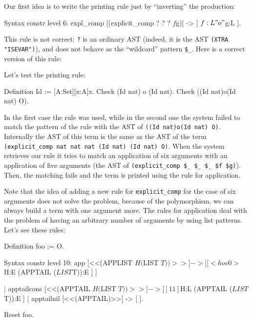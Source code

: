 {Our first idea is to write the printing rule just by ``inverting'' the
production:

\begin{coq_example} 
Syntax constr level 6:
  expl_comp [(explicit_comp ? ? ? $f $g)] -> [ $f:L "o" $g:L ].
\end{coq_example}

This rule is not correct: \verb+?+ is an ordinary AST (indeed, it is
the AST \verb|(XTRA "ISEVAR")|), and does not behave as the
``wildcard'' pattern \verb|$_|. Here is a correct version of this
rule:


Let's test the printing rule:

\begin{coq_example}
Definition Id := [A:Set][x:A]x.
Check (Id nat) o (Id nat).
Check ((Id nat)o(Id nat)  O).
\end{coq_example}

In the first case the rule was used, while in the second one the
system failed to match the pattern of the rule with the AST of
\verb+((Id nat)o(Id nat) O)+.
Internally the AST of this term is the same as the AST of the
term \verb+(explicit_comp nat nat nat (Id nat) (Id nat) O)+.
When the system retrieves our rule it tries to match an application of
six arguments with an application of five arguments (the AST of
\verb+(explicit_comp $_ $_ $_ $f $g)+).
  Then, the matching fails and
the term is printed using the rule for application.

Note that the idea of adding a new rule for \verb+explicit_comp+ for
the case of six arguments does not solve the problem, because of the
polymorphism, we can always build a term with one argument more.  The
rules for application deal with the problem of having an arbitrary
number of arguments by using list patterns. Let's see these rules:

\begin{coq_eval}
Definition foo := O.
\end{coq_eval}
\begin{coq_example*}
Syntax constr level 10:
  app [<<(APPLIST $H ($LIST $T))>>] ->
      [ [<hov 0>  $H:E (APPTAIL ($LIST $T)):E ] ]

| apptailcons [<<(APPTAIL $H ($LIST $T))>>] ->
      [ [1 1] $H:L (APPTAIL ($LIST $T)):E ]
| apptailnil [<<(APPTAIL)>>] -> [ ].
\end{coq_example*}
\begin{coq_eval}
Reset foo.
\end{coq_eval}

}
